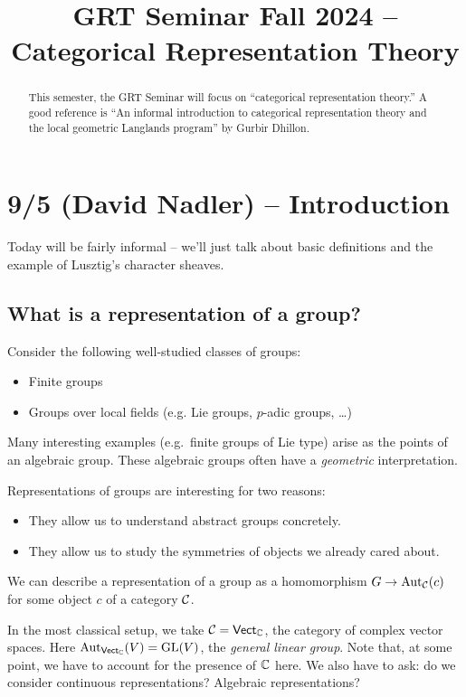\documentclass{article}
\title{GRT Seminar Fall 2024 -- Categorical Representation Theory}
\begin{document}
\maketitle

\begin{abstract}
	This semester, the GRT Seminar will focus on ``categorical representation theory.''
	A good reference is ``An informal introduction to categorical representation theory and the local geometric Langlands program'' by Gurbir Dhillon.
\end{abstract}

\tableofcontents

\section{9/5 (David Nadler) -- Introduction}

Today will be fairly informal -- we'll just talk about basic definitions and the example of Lusztig's character sheaves.

\subsection{What is a representation of a group?}

Consider the following well-studied classes of groups:
\begin{itemize}
	\item Finite groups
	\item Groups over local fields (e.g. Lie groups, $p$-adic groups, \dots)
\end{itemize}
Many interesting examples (e.g.\ finite groups of Lie type) arise as the points of an algebraic group.
These algebraic groups often have a \emph{geometric} interpretation.

Representations of groups are interesting for two reasons:
\begin{itemize}
	\item They allow us to understand abstract groups concretely.
	\item They allow us to study the symmetries of objects we already cared about.
\end{itemize}
We can describe a representation of a group as a homomorphism $G \to \operatorname{Aut}_{\mathcal{C}}(c)$ for some object $c$ of a category $\mathcal{C}$.

\begin{ex}
	In the most classical setup, we take $\mathcal{C} = \mathsf{Vect}_{\mathbb{C}}$, the category of complex vector spaces.
	Here $\operatorname{Aut}_{\mathsf{Vect}_{\mathbb{C}}}(V) = \operatorname{GL}(V)$, the \emph{general linear group}.
	Note that, at some point, we have to account for the presence of $\mathbb{C}$ here.
	We also have to ask: do we consider continuous representations? Algebraic representations?
\end{ex}
\end{document}
